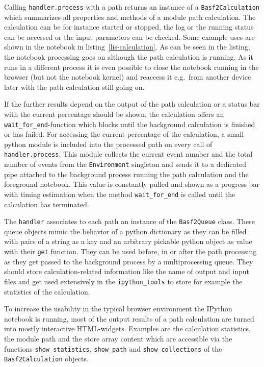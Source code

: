 Calling \texttt{handler.process} with a path returns an instance of a \texttt{Basf2Calculation} which summarizes all properties and methods of a module path calculation. The calculation can be for instance started or stopped, the log or the running status can be accessed or the input parameters can be checked. Some example uses are shown in the notebook in listing~\ref{lis-calculation}. As can be seen in the listing, the notebook processing goes on although the path calculation is running. As it runs in a different process it is even possible to close the notebook running in the browser (but not the notebook kernel) and reaccess it e.g.\ from another device later with the path calculation still going on.

If the further results depend on the output of the path calculation or a status bar with the current percentage should be shown, the calculation offers an \verb+wait_for_end+-function which blocks until the background calculation is finished or has failed. For accessing the current percentage of the calculation, a small python module is included into the processed path on every call of \texttt{handler.process}. This module collects the current event number and the total number of events from the \texttt{Environment} singleton and sends it to a dedicated pipe attached to the background process running the path calculation and the foreground notebook. This value is constantly pulled and shown as a progress bar with timing estimation when the method \verb+wait_for_end+ is called until the calculation has terminated.

The \texttt{handler} associates to each path an instance of the \texttt{Basf2Queue} class. These queue objects mimic the behavior of a python dictionary as they can be filled with pairs of a string as a key and an arbitrary pickable python object as value with their \verb+get+ function. They can be used before, in or after the path processing as they get passed to the background process by a multiprocessing queue. They should store calculation-related information like the name of output and input files and get used extensively in the \texttt{ipython\_tools} to store for example the statistics of the calculation.

To increase the usability in the typical browser environment the IPython notebook is running, most of the output results of a path calculation are turned into mostly interactive HTML-widgets. Examples are the calculation statistics, the module path and the store array content which are accessible via the functions \verb+show_statistics+, \verb+show_path+ and \verb+show_collections+ of the \texttt{Basf2Calculation} objects.

